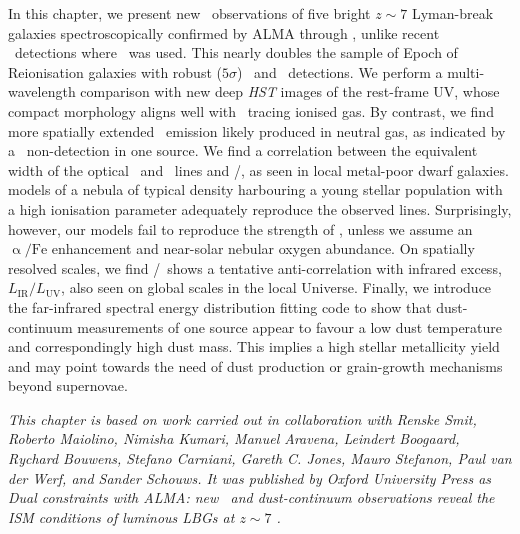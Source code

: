     \fancyhf{}
    \fancyfoot[C]{\color{ALMAsky}\thepage}
    \newpage
    \setFancyHdr
\fi

\vspace*{\fill}

\noindent In this chapter, we present new \OIIILam\ observations of five bright $z \sim 7$ Lyman-break galaxies spectroscopically confirmed by ALMA through \CIILam, unlike recent \OIIIf\ detections where \lya\ was used. This nearly doubles the sample of Epoch of Reionisation galaxies with robust ($5 \sigma$) \CII\ and \OIIIf\ detections. We perform a multi-wavelength comparison with new deep \textit{HST} images of the rest-frame UV, whose compact morphology aligns well with \OIIIf\ tracing ionised gas. By contrast, we find more spatially extended \CII\ emission likely produced in neutral gas, as indicated by a \NIILam\ non-detection in one source. We find a correlation between the equivalent width of the optical \OIIIf\ and \Hbeta\ lines and \OIIIf/\CII, as seen in local metal-poor dwarf galaxies.  models of a nebula of typical density harbouring a young stellar population with a high ionisation parameter adequately reproduce the observed lines. Surprisingly, however, our models fail to reproduce the strength of \OIIILam, unless we assume an $\mathrm{\upalpha/Fe}$ enhancement and near-solar nebular oxygen abundance. On spatially resolved scales, we find \OIIIf/\CII\ shows a tentative anti-correlation with infrared excess, $L_\text{IR}/L_\text{UV}$, also seen on global scales in the local Universe. Finally, we introduce the far-infrared spectral energy distribution fitting code  to show that dust-continuum measurements of one source appear to favour a low dust temperature and correspondingly high dust mass. This implies a high stellar metallicity yield and may point towards the need of dust production or grain-growth mechanisms beyond supernovae.

\vspace{3ex}
\begin{mdframed}[backgroundcolor=black!2.5]
    \textsl{This chapter is based on work carried out in collaboration with Renske Smit, Roberto Maiolino, Nimisha Kumari, Manuel Aravena, Leindert Boogaard, Rychard Bouwens, Stefano Carniani, Gareth C. Jones, Mauro Stefanon, Paul van der Werf, and Sander Schouws. It was published by Oxford University Press as \textup{Dual constraints with ALMA: new \OIIILam\ and dust-continuum observations reveal the ISM conditions of luminous LBGs at $z \sim 7$} \citep[, MNRAS, 515, 1751]{2022MNRAS.515.1751W}.}
\end{mdframed}
\vspace*{\fill}


